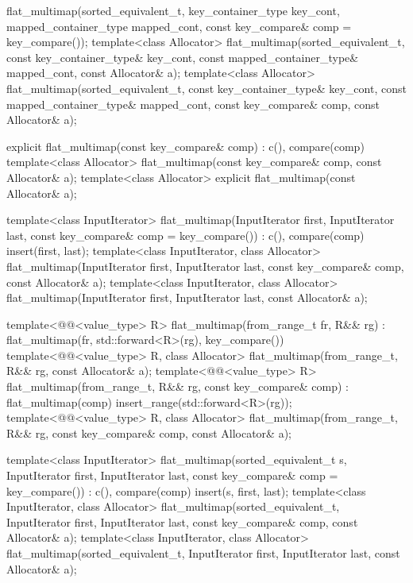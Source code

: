\begin{codeblock}
{{    flat_multimap(sorted_equivalent_t,
                  key_container_type key_cont, mapped_container_type mapped_cont,
                  const key_compare& comp = key_compare());
    template<class Allocator>
      flat_multimap(sorted_equivalent_t, const key_container_type& key_cont,
                    const mapped_container_type& mapped_cont, const Allocator& a);
    template<class Allocator>
      flat_multimap(sorted_equivalent_t, const key_container_type& key_cont,
                    const mapped_container_type& mapped_cont,
                    const key_compare& comp, const Allocator& a);

    explicit flat_multimap(const key_compare& comp)
      : c(), compare(comp) { }
    template<class Allocator>
      flat_multimap(const key_compare& comp, const Allocator& a);
    template<class Allocator>
      explicit flat_multimap(const Allocator& a);

    template<class InputIterator>
      flat_multimap(InputIterator first, InputIterator last,
                    const key_compare& comp = key_compare())
        : c(), compare(comp)
        { insert(first, last); }
    template<class InputIterator, class Allocator>
      flat_multimap(InputIterator first, InputIterator last,
                    const key_compare& comp, const Allocator& a);
    template<class InputIterator, class Allocator>
      flat_multimap(InputIterator first, InputIterator last, const Allocator& a);

    template<@@<value_type> R>
      flat_multimap(from_range_t fr, R&& rg)
        : flat_multimap(fr, std::forward<R>(rg), key_compare()) { }
    template<@@<value_type> R, class Allocator>
      flat_multimap(from_range_t, R&& rg, const Allocator& a);
    template<@@<value_type> R>
      flat_multimap(from_range_t, R&& rg, const key_compare& comp)
        : flat_multimap(comp) { insert_range(std::forward<R>(rg)); }
    template<@@<value_type> R, class Allocator>
      flat_multimap(from_range_t, R&& rg, const key_compare& comp, const Allocator& a);

    template<class InputIterator>
      flat_multimap(sorted_equivalent_t s, InputIterator first, InputIterator last,
                    const key_compare& comp = key_compare())
        : c(), compare(comp) { insert(s, first, last); }
    template<class InputIterator, class Allocator>
      flat_multimap(sorted_equivalent_t, InputIterator first, InputIterator last,
                    const key_compare& comp, const Allocator& a);
    template<class InputIterator, class Allocator>
      flat_multimap(sorted_equivalent_t, InputIterator first, InputIterator last,
                    const Allocator& a);

}}
\end{codeblock}
